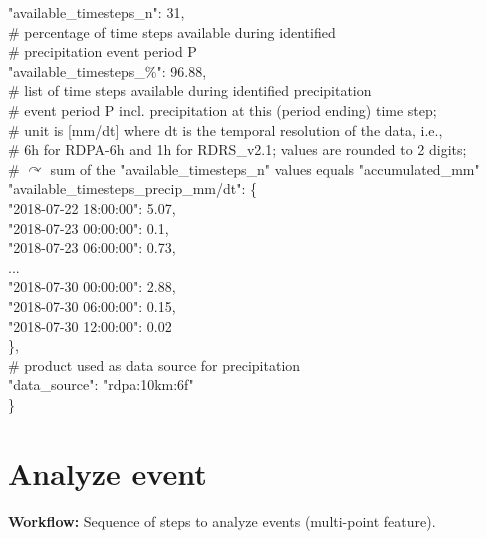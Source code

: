 \documentclass[10pt,a4paper,titlepage,parskip]{scrartcl}
\newenvironment{ttfont}{\fontfamily{\ttdefault}\selectfont}{\par}
\newcommand{\GRAU}[1]{\textcolor{ufzgray2}{#1}}
\begin{document}
\begin{framed}
\begin{ttfont}
\begin{tabbing}
				\> "available\_timesteps\_n": 31,  \\
				\> \GRAU{\# percentage of time steps available during identified }\\
				\> \GRAU{\# precipitation event period P}\\
				\> "available\_timesteps\_\%": 96.88,  \\
				\> \GRAU{\# list of time steps available during identified precipitation}\\
				\> \GRAU{\# event period P incl. precipitation at this (period ending) time step; }\\
				\> \GRAU{\# unit is [mm/dt] where dt is the temporal resolution of the data, i.e.,}\\
				\> \GRAU{\# 6h for RDPA-6h and 1h for RDRS\_v2.1; values are rounded to 2 digits;}\\
				\> \GRAU{\# $\curvearrowright$ sum of the "available\_timesteps\_n" values equals "accumulated\_mm"}\\
				\> "available\_timesteps\_precip\_mm/dt": \{ \\
				\> \> 	"2018-07-22 18:00:00": 5.07,  \\
				\> \> 	"2018-07-23 00:00:00": 0.1,  \\
				\> \> 	"2018-07-23 06:00:00": 0.73,  \\
				\> \> 	...  \\
				\> \> 	"2018-07-30 00:00:00": 2.88,  \\
				\> \> 	"2018-07-30 06:00:00": 0.15,  \\
				\> \> 	"2018-07-30 12:00:00": 0.02  \\
				\> \},  \\
				\> \GRAU{\# product used as data source for precipitation}\\
				\> "data\_source": "rdpa:10km:6f" \\
			\} \\
		\end{tabbing}
	\end{ttfont}
	\vspace*{-0.3cm}
\end{framed}
\vspace*{-0.3cm}
\pagebreak


\section{Analyze event}

\textbf{Workflow:} Sequence of steps to analyze events (multi-point feature).
\end{document}
